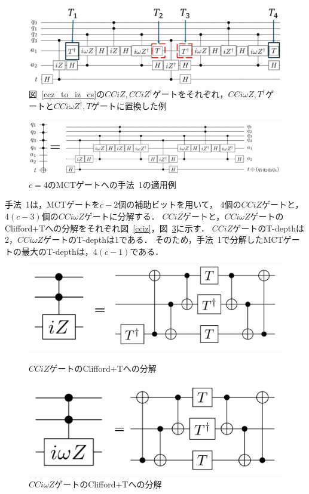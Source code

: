 \begin{figure}[tbp]
  \centering
  \includegraphics[width=14cm]{img/barenco_iz_to_iomegaz.pdf}
  \caption{図~\ref{ccz_to_iz_cs}の$CCiZ, CCiZ^{\dag}$ゲートをそれぞれ，$CCi\omega Z, T^{\dag}$ゲートと$CCi\omega Z^{\dag}, T$ゲートに置換した例}
  \label{barenco_iz_to_iomegaz}
\end{figure}
\begin{figure}[tbp]
  \centering
  \includegraphics[width=0.9\columnwidth]{img/techmap.pdf}
  \caption{$c=4$のMCTゲートへの手法~1の適用例}
  \label{techmap}
\end{figure}
\par
手法~1は，MCTゲートを$c-2$個の補助ビットを用いて，
4個の$CCiZ$ゲートと，$4(c-3)$個の$CCi\omega Z$ゲートに分解する．
$CCiZ$ゲートと，$CCi\omega Z$ゲートのClifford+Tへの分解をそれぞれ図~\ref{cciz}，図~\ref{cciomegaz}に示す．
$CCiZ$ゲートのT-depthは2，$CCi\omega Z$ゲートのT-depthは1である．
そのため，手法~1で分解したMCTゲートの最大のT-depthは，$4(c-1)$である．
\begin{figure}[tbp]
  \centering
  \begin{minipage}[b]{0.49\columnwidth}
    \centering
    \includegraphics[width=0.9\columnwidth]{img/cciz.pdf}
    \caption{$CCiZ$ゲートのClifford+Tへの分解}
    \label{cciz}    
  \end{minipage}
  \begin{minipage}[b]{0.49\columnwidth}
    \centering
    \includegraphics[width=0.9\columnwidth]{img/cciomegaz.pdf}
    \caption{$CCi\omega Z$ゲートのClifford+Tへの分解}
    \label{cciomegaz}    
  \end{minipage}
\end{figure}
